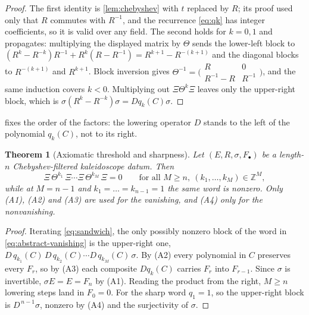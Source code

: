 \documentclass[11pt,reqno]{amsart}
\theoremstyle{plain}
\newtheorem{theorem}{Theorem}[section]
\theoremstyle{definition}
\theoremstyle{remark}
\numberwithin{equation}{section}
\begin{document}
\begin{proof}
The first identity is \cref{lem:chebyshev} with $t$ replaced by $R$; its proof
used only that $R$ commutes with $R^{-1}$, and the recurrence
\cref{eq:qk} has integer coefficients, so it is valid over any field. The
second holds for $k=0,1$ and propagates: multiplying the displayed matrix by
$\Theta$ sends the lower-left block to
$(R^{k}-R^{-k})R^{-1}+R^{k}(R-R^{-1})=R^{k+1}-R^{-(k+1)}$ and the diagonal
blocks to $R^{-(k+1)}$ and $R^{k+1}$. Block inversion gives
$\Theta^{-1}=\bigl(\begin{smallmatrix}R&0\\R^{-1}-R&R^{-1}\end{smallmatrix}\bigr)$,
and the same induction covers $k<0$. Multiplying out
$\Xi\Theta^{k}\Xi$ leaves only the upper-right block, which is
$\sigma(R^{k}-R^{-k})\sigma=Dq_{k}(C)\sigma$.
\end{proof}

 fixes the order of the factors: the lowering operator $D$
stands to the left of the polynomial $q_{k}(C)$, not to its right.

\begin{theorem}[Axiomatic threshold and sharpness]
\label{thm:abstract-main}
Let $(E,R,\sigma,F_{\bullet})$ be a length-$n$ Chebyshev-filtered kaleidoscope
datum. Then
\begin{equation}
  \Xi\,\Theta^{k_{1}}\,\Xi\cdots\Xi\,\Theta^{k_{M}}\,\Xi=0
  \qquad\text{for all } M\ge n,\ (k_{1},\dots,k_{M})\in\mathbb{Z}^{M},
  \label{eq:abstract-vanishing}
\end{equation}
while at $M=n-1$ and $k_{1}=\dots=k_{n-1}=1$ the same word is nonzero. Only
(A1), (A2) and (A3) are used for the vanishing, and (A4) only for the
nonvanishing.
\end{theorem}

\begin{proof}
Iterating \cref{eq:sandwich}, the only possibly nonzero block of the word in
\cref{eq:abstract-vanishing} is the upper-right one,
$D\,q_{k_{1}}(C)\,D\,q_{k_{2}}(C)\cdots D\,q_{k_{M}}(C)\,\sigma$. By (A2) every
polynomial in $C$ preserves every $F_{r}$, so by (A3) each composite
$Dq_{k}(C)$ carries $F_{r}$ into $F_{r-1}$. Since $\sigma$ is invertible,
$\sigma E=E=F_{n}$ by (A1). Reading the product from the right, $M\ge n$
lowering steps land in $F_{0}=0$. For the sharp word $q_{1}=1$, so the
upper-right block is $D^{\,n-1}\sigma$, nonzero by (A4) and the surjectivity of
$\sigma$.
\end{proof}
\end{document}
